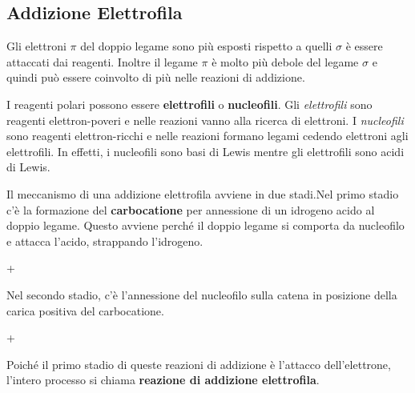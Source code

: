 \subsection{Addizione Elettrofila}
Gli elettroni \(\pi\) del doppio legame sono più esposti rispetto a quelli \(\sigma\) è essere attaccati dai reagenti. Inoltre il legame \(\pi\) è molto più debole del legame \(\sigma\) e quindi può essere coinvolto di più nelle reazioni di addizione.

I reagenti polari possono essere \textbf{elettrofili} o \textbf{nucleofili}. Gli \textit{elettrofili} sono reagenti elettron-poveri e nelle reazioni vanno alla ricerca di elettroni. I \textit{nucleofili} sono reagenti elettron-ricchi e nelle reazioni formano legami cedendo elettroni agli elettrofili. In effetti, i nucleofili sono basi di Lewis mentre gli elettrofili sono acidi di Lewis.

Il meccanismo di una addizione elettrofila avviene in due stadi.Nel primo stadio c'è la formazione del \textbf{carbocatione} per annessione di un idrogeno acido al doppio legame. Questo avviene perché il doppio legame si comporta da nucleofilo e attacca l'acido, strappando l'idrogeno.
\chemnameinit{}
\begin{reaction*}
	 +  \arrow {}
\end{reaction*}
Nel secondo stadio, c'è l'annessione del nucleofilo sulla catena in posizione della carica positiva del carbocatione.
\chemnameinit{}
\begin{reaction*}
	 +  \arrow {}
\end{reaction*}

Poiché il primo stadio di queste reazioni di addizione è l'attacco dell'elettrone, l'intero processo si chiama \textbf{reazione di addizione elettrofila}.


